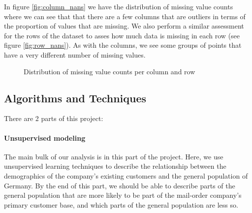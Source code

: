 In figure \ref{fig:column_nans} we have the distribution of missing value counts where we can see that that there are a few columns that are outliers in terms of the proportion of values that are missing. We also perform a similar assessment for the rows of the dataset to asses how much data is missing in each row (see figure \ref{fig:row_nans}). As with the columns, we see some groups of points that have a very different number of missing values.

\begin{figure}[h]
  \centering
  \hfill
  \caption{Distribution of missing value counts per column and row}
\end{figure}

\subsection{Algorithms and Techniques}

There are 2 parts of this project:

\paragraph{Unsupervised modeling}
The main bulk of our analysis is in this part of the project. Here, we use unsupervised learning techniques to describe the relationship between the demographics of the company's existing customers and the general population of Germany. By the end of this part, we should be able to describe parts of the general population that are more likely to be part of the mail-order company's primary customer base, and which parts of the general population are less so.

